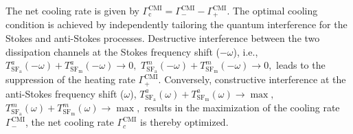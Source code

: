 \documentclass[aps, prresearch, reprint, nofootinbib, longbibliography]{revtex4-2}
\begin{document}
The net cooling rate is given by
$
\Gamma_{\text{c}}^{\text{CMI}} = \Gamma_{-}^{\text{CMI}} - \Gamma_{+}^{\text{CMI}}.
$
The optimal cooling condition is achieved by independently tailoring the quantum interference for the Stokes and anti-Stokes processes. Destructive interference between the two dissipation channels at the Stokes frequency shift ($-\omega$), i.e.,
$
T^a_\mathrm{SF_a} (-\omega) + T^a_\mathrm{SF_m}(-\omega) \to 0, $
$
T^m_\mathrm{SF_a} (-\omega) + T^m_\mathrm{SF_m} (-\omega) \to 0,
$
leads to the suppression of the heating rate $\Gamma_{+}^{\text{CMI}}$. Conversely, constructive interference at the anti-Stokes frequency shift  ($\omega$),
$T^a_\mathrm{SF_a} (\omega) + T^a_\mathrm{SF_m}(\omega) \to \max,$ %
$	T^m_\mathrm{SF_a} (\omega) + T^m_\mathrm{SF_m} (\omega) \to \max,$
results in the maximization of the cooling rate $\Gamma_{-}^{\text{CMI}}$, the net cooling rate $\Gamma_{c}^{\text{CMI}}$ is thereby optimized.
\end{document}
